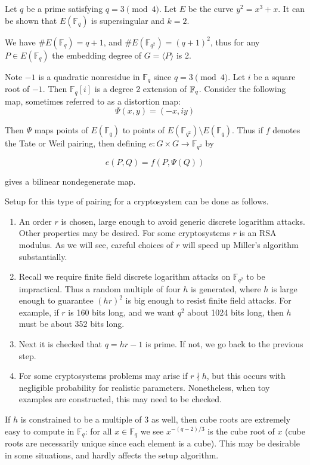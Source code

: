 Let $q$ be a prime satisfying $q = 3 \pmod{4}$.
Let $E$ be the curve $y^2 = x^3 + x$. It can be shown \cite{silverman}
that $E(\mathbb{F}_q)$ is supersingular and $k = 2$.

We have $\#E(\mathbb{F}_q) = q+1$, and $\#E(\mathbb{F}_{q^2}) = (q+1)^2$,
thus for any $P\in E(\mathbb{F}_q)$
the embedding degree of $G = \langle P \rangle$ is 2.

Note $-1$ is a quadratic nonresidue in $\mathbb{F}_q$ since $q = 3\pmod{4}$.
Let $i$ be a square root of $-1$. Then $\mathbb{F}_q[i]$ is a degree 2
extension of $\mathbb{F}_q$.
Consider the following map, sometimes referred to as a distortion map:
\[ \Psi(x, y) = (-x, i y) \]

Then $\Psi$ maps points of $E(\mathbb{F}_q)$ to points of
$E(\mathbb{F}_{q^2}) \setminus E(\mathbb{F}_q)$. Thus if $f$ denotes the
Tate or Weil pairing, then defining $e:G \times G \rightarrow \mathbb{F}_{q^2}$
by

\[ e(P,Q) = f(P, \Psi(Q)) \]

gives a bilinear nondegenerate map.

Setup for this type of pairing for a cryptosystem can be done as follows.

\begin{enumerate}
\item
An order $r$ is chosen, large enough to avoid generic discrete logarithm
attacks. Other properties may be desired. For some cryptosystems $r$ is
an RSA modulus. As we will see, careful choices of $r$ will speed up Miller's
algorithm substantially.
\item
Recall we require finite field discrete logarithm attacks on $\mathbb{F}_{q^2}$
to be impractical. Thus a random multiple of four $h$ is generated,
where $h$ is large enough to guarantee $(hr)^2$ is big enough to resist
finite field attacks. For example, if $r$ is 160 bits long, and we want
$q^2$ about 1024 bits long, then $h$ must be about 352 bits long.
\item
Next it is checked that $q = h r - 1$ is prime.
If not, we go back to the previous step.
\item
For some cryptosystems problems may arise if $r \nmid h$, but this occurs
with negligible probability for realistic parameters. Nonetheless, when toy
examples are constructed, this may need to be checked.
\end{enumerate}

If $h$ is constrained to be a multiple of $3$ as well, then cube roots are
extremely easy to compute in $\mathbb{F}_{q}$:
for all $x \in \mathbb{F}_q$ we see $x^{-(q-2)/3}$ is the cube root of $x$
(cube roots are necessarily unique since each element is a cube).
This may be desirable in some situations, and hardly affects the setup
algorithm.


